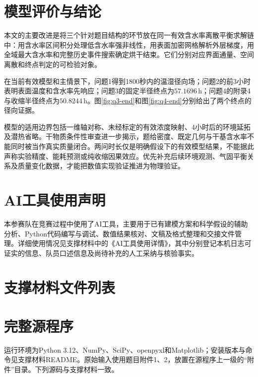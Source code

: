 \documentclass[UTF8,12pt,a4paper]{ctexart}
\begin{document}
\section{模型评价与结论}
本文的主要改进是将三个针对题目结构的环节放在同一有效含水率离散平衡求解链中：用含水率区间积分处理低含水率强非线性，用表面加密网格解析外层梯度，用全域最大含水率和完整历史事件搜索确定烘干结束。它们分别对应界面通量、空间离散和终点判定的可检验对象。

在当前有效模型和主情景下，问题1得到1800秒内的温湿径向场；问题2的前3小时表明表面温度和含水率先响应；问题3的固定半径终点为$57.1696\,\mathrm h$；问题4的附录4与收缩半径终点为$50.8244\,\mathrm h$。图\ref{fig:q3-end}和图\ref{fig:q4-end}分别给出了两个终点的径向证据。

模型的适用边界包括一维轴对称、未经标定的有效浓度映射、4小时后的环境延拓及潜热省略。干物质条件性审查进一步揭示，题给密度、既定几何与干基含水率不能同时被当作真实质量闭合。两问时长仅是明确假设下的有效模型结果，不能据此声称实验精度、能耗预测或纯收缩因果效应。优先补充后续环境观测、气固平衡关系及质量变化数据，才能把数值实现验证推进为物理验证。


\section*{AI工具使用声明}
本参赛队在竞赛过程中使用了AI工具，主要用于已有建模方案和科学假设的辅助分析、Python代码编写与调试、数值结果核对、文稿及格式整理和交接文件管理。详细使用情况见支撑材料中的《AI工具使用详情》，其中分别登记本机日志可证实的信息、队员口述信息及尚待补充的人工采纳与核验事实。




\clearpage
\appendix
\section{支撑材料文件列表}

\section{完整源程序}
运行环境为Python 3.12、NumPy、SciPy、openpyxl和Matplotlib；安装版本与命令见支撑材料README。原始输入使用题目附件1、2，放置在源程序上一级的“附件”目录。下列源码与支撑材料一致。

\end{document}
